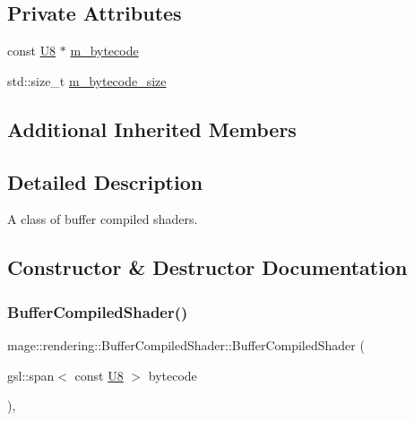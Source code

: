 \subsection*{Private Attributes}
\begin{DoxyCompactItemize}
\item 
const \mbox{\hyperlink{namespacemage_a30677c03d683c4c35630c25f6ff3fb7f}{U8}} $\ast$ \mbox{\hyperlink{classmage_1_1rendering_1_1_buffer_compiled_shader_a541d885c95b5430072f3da696194ec91}{m\+\_\+bytecode}}
\item 
std\+::size\+\_\+t \mbox{\hyperlink{classmage_1_1rendering_1_1_buffer_compiled_shader_a3b35d0934483ff7e4b08608b162e340e}{m\+\_\+bytecode\+\_\+size}}
\end{DoxyCompactItemize}
\subsection*{Additional Inherited Members}


\subsection{Detailed Description}
A class of buffer compiled shaders. 

\subsection{Constructor \& Destructor Documentation}
\mbox{\label{classmage_1_1rendering_1_1_buffer_compiled_shader_a104f1006017743ca041e123e8d4c3e6f}} 
\subsubsection{\texorpdfstring{Buffer\+Compiled\+Shader()}{BufferCompiledShader()}\hspace{0.1cm}{\footnotesize\ttfamily [1/3]}}
{\footnotesize\ttfamily mage\+::rendering\+::\+Buffer\+Compiled\+Shader\+::\+Buffer\+Compiled\+Shader (\begin{DoxyParamCaption}\item[{gsl\+::span$<$ const \mbox{\hyperlink{namespacemage_a30677c03d683c4c35630c25f6ff3fb7f}{U8}} $>$}]{bytecode }\end{DoxyParamCaption})\hspace{0.3cm}{\ttfamily [explicit]}, {\ttfamily [noexcept]}}

